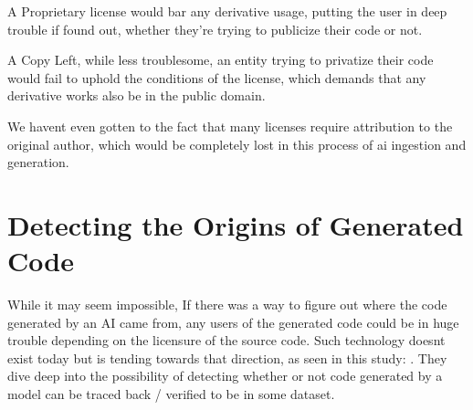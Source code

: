 \documentclass[journal]{IEEEtran}
\begin{document}
A Proprietary license would bar any derivative usage, putting the
user in deep trouble if found out, whether they're trying to publicize
their code or not.

A Copy Left, while less troublesome, an entity trying to privatize their code
would fail to uphold the conditions of the license, which demands that any derivative
works also be in the public domain.

We havent even gotten to the fact that many licenses require attribution to the
original author, which would be completely lost in this process of ai ingestion
and generation.









\section{Detecting the Origins of Generated Code}

While it may seem impossible, If there was a way to figure out where
the code generated by an AI came from, any users of the generated code
could be in huge trouble depending on the licensure of the source code.
Such technology doesnt exist today but is tending towards that direction,
as seen in this study: \cite{ma2024}. They dive deep into the possibility
of detecting whether or not code generated by a model can be traced
back / verified to be in some dataset.
\end{document}

